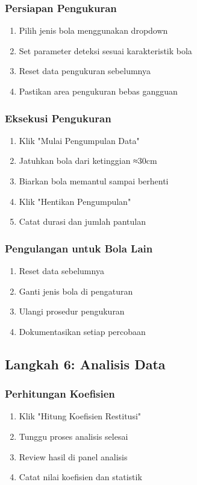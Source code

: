\documentclass[12pt,a4paper]{article}
\begin{document}
\subsubsection{Persiapan Pengukuran}
\begin{enumerate}
    \item Pilih jenis bola menggunakan dropdown
    \item Set parameter deteksi sesuai karakteristik bola
    \item Reset data pengukuran sebelumnya
    \item Pastikan area pengukuran bebas gangguan
\end{enumerate}

\subsubsection{Eksekusi Pengukuran}
\begin{enumerate}
    \item Klik "Mulai Pengumpulan Data"
    \item Jatuhkan bola dari ketinggian ≈30cm
    \item Biarkan bola memantul sampai berhenti
    \item Klik "Hentikan Pengumpulan"
    \item Catat durasi dan jumlah pantulan
\end{enumerate}

\subsubsection{Pengulangan untuk Bola Lain}
\begin{enumerate}
    \item Reset data sebelumnya
    \item Ganti jenis bola di pengaturan
    \item Ulangi prosedur pengukuran
    \item Dokumentasikan setiap percobaan
\end{enumerate}

\subsection{Langkah 6: Analisis Data}

\subsubsection{Perhitungan Koefisien}
\begin{enumerate}
    \item Klik "Hitung Koefisien Restitusi"
    \item Tunggu proses analisis selesai
    \item Review hasil di panel analisis
    \item Catat nilai koefisien dan statistik
\end{enumerate}
\end{document}
